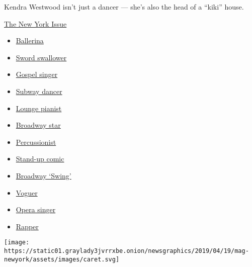 Kendra Westwood isn't just a dancer --- she's also the head of a
``kiki'' house.

\href{https://www.nytimes3xbfgragh.onion/interactive/2019/05/30/magazine/performers-new-york.html}{The
New York Issue}

\begin{itemize}
\tightlist
\item
  \href{https://www.nytimes3xbfgragh.onion/interactive/2019/05/30/magazine/dance-ballet-new-york.html}{Ballerina}
\item
  \href{https://www.nytimes3xbfgragh.onion/interactive/2019/05/30/magazine/sword-swallowing-new-york.html}{Sword
  swallower}
\item
  \href{https://www.nytimes3xbfgragh.onion/interactive/2019/05/30/magazine/gospel-singer-new-york.html}{Gospel
  singer}
\item
  \href{https://www.nytimes3xbfgragh.onion/interactive/2019/05/30/magazine/subway-dance-new-york.html}{Subway
  dancer}
\item
  \href{https://www.nytimes3xbfgragh.onion/interactive/2019/05/30/magazine/earl-rose-piano-carlyle-new-york.html}{Lounge
  pianist}
\item
  \href{https://www.nytimes3xbfgragh.onion/interactive/2019/05/30/magazine/broadway-kiss-me-kate.html}{Broadway
  star}
\item
  \href{https://www.nytimes3xbfgragh.onion/interactive/2019/05/30/magazine/latin-beat-new-york.html}{Percussionist}
\item
  \href{https://www.nytimes3xbfgragh.onion/interactive/2019/05/30/magazine/female-comedy-new-york.html}{Stand-up
  comic}
\item
  \href{https://www.nytimes3xbfgragh.onion/interactive/2019/05/30/magazine/aladdin-musical-new-york.html}{Broadway
  `Swing'}
\item
  \href{https://www.nytimes3xbfgragh.onion/interactive/2019/05/30/magazine/vogue-kiki-new-york.html}{Voguer}
\item
  \href{https://www.nytimes3xbfgragh.onion/interactive/2019/05/30/magazine/metropolitan-opera-singer-new-york.html}{Opera
  singer}
\item
  \href{https://www.nytimes3xbfgragh.onion/interactive/2019/05/30/magazine/princess-nokia-new-york.html}{Rapper}
\end{itemize}

\texttt{[image: https://static01.graylady3jvrrxbe.onion/newsgraphics/2019/04/19/mag-newyork/assets/images/caret.svg]}

